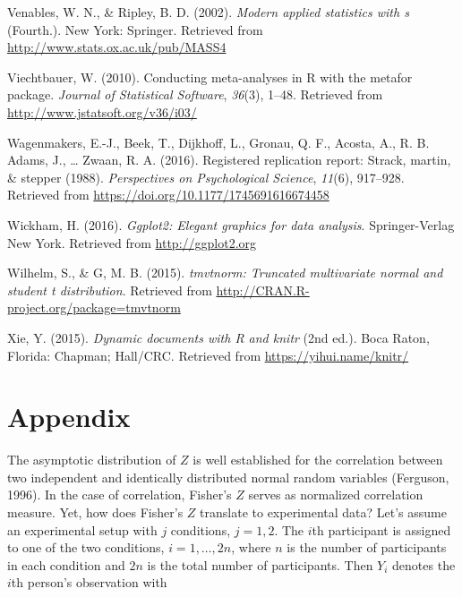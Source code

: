 \documentclass[english,,man]{apa6}
\begin{document}
\leavevmode\hypertarget{ref-R-MASS}{}%
Venables, W. N., \& Ripley, B. D. (2002). \emph{Modern applied statistics with s} (Fourth.). New York: Springer. Retrieved from \url{http://www.stats.ox.ac.uk/pub/MASS4}

\leavevmode\hypertarget{ref-R-metafor}{}%
Viechtbauer, W. (2010). Conducting meta-analyses in R with the metafor package. \emph{Journal of Statistical Software}, \emph{36}(3), 1--48. Retrieved from \url{http://www.jstatsoft.org/v36/i03/}

\leavevmode\hypertarget{ref-Wagenmakers:etal:2016b}{}%
Wagenmakers, E.-J., Beek, T., Dijkhoff, L., Gronau, Q. F., Acosta, A., R. B. Adams, J., \ldots{} Zwaan, R. A. (2016). Registered replication report: Strack, martin, \& stepper (1988). \emph{Perspectives on Psychological Science}, \emph{11}(6), 917--928. Retrieved from \url{https://doi.org/10.1177/1745691616674458}

\leavevmode\hypertarget{ref-R-ggplot2}{}%
Wickham, H. (2016). \emph{Ggplot2: Elegant graphics for data analysis}. Springer-Verlag New York. Retrieved from \url{http://ggplot2.org}

\leavevmode\hypertarget{ref-R-tmvtnorm}{}%
Wilhelm, S., \& G, M. B. (2015). \emph{tmvtnorm: Truncated multivariate normal and student t distribution}. Retrieved from \url{http://CRAN.R-project.org/package=tmvtnorm}

\leavevmode\hypertarget{ref-R-knitr}{}%
Xie, Y. (2015). \emph{Dynamic documents with R and knitr} (2nd ed.). Boca Raton, Florida: Chapman; Hall/CRC. Retrieved from \url{https://yihui.name/knitr/}

\endgroup

\newpage

\hypertarget{appendix}{%
\section{Appendix}\label{appendix}}

The asymptotic distribution of \(Z\) is well established for the correlation between two independent and identically distributed normal random variables (Ferguson, 1996). In the case of correlation, Fisher's \(Z\) serves as normalized correlation measure. Yet, how does Fisher's \(Z\) translate to experimental data? Let's assume an experimental setup with \(j\) conditions, \(j = 1, 2\). The \(i\)th participant is assigned to one of the two conditions, \(i = 1, \ldots, 2n\), where \(n\) is the number of participants in each condition and \(2n\) is the total number of participants. Then \(Y_i\) denotes the \(i\)th person's observation with
\end{document}
